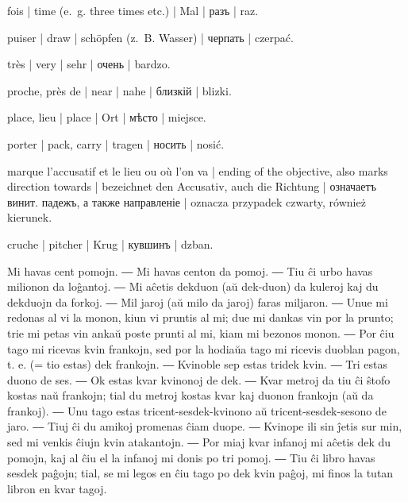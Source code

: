 \begin{ekzvocab}{1em}
 fois | time (e.~g. three times etc.) | Mal | разъ | raz.

 puiser | draw | schöpfen (z.~B. Wasser) | черпать | czerpać.

 très | very | sehr | очень | bardzo.

 proche, près de | near | nahe | близкій | blizki.

 place, lieu | place | Ort | мѣсто | miejsce.

 porter | pack, carry | tragen | носить | nosić.

 marque l’accusatif et le lieu ou où l’on va | ending of the objective, also marks direction towards | bezeichnet den Accusativ, auch die Richtung | означаетъ винит. падежъ, а также направленіе | oznacza przypadek czwarty, również kierunek.

 cruche | pitcher | Krug | кувшинъ | dzban.

\end{ekzvocab}



Mi havas cent pomojn. ― Mi havas centon da pomoj. ― Tiu ĉi urbo havas milionon da loĝantoj. ― Mi aĉetis dekduon (aŭ dek-duon) da kuleroj kaj du dekduojn da forkoj. ― Mil jaroj (aŭ milo da jaroj) faras miljaron. ― Unue mi redonas al vi la monon, kiun vi pruntis al mi; due mi dankas vin por la prunto; trie mi petas vin ankaŭ poste prunti al mi, kiam mi bezonos monon. ― Por ĉiu tago mi ricevas kvin frankojn, sed por la hodiaŭa tago mi ricevis duoblan pagon, t. e. (= tio estas) dek frankojn. ― Kvinoble sep estas tridek kvin. ― Tri estas duono de ses. ― Ok estas kvar kvinonoj de dek. ― Kvar metroj da tiu ĉi ŝtofo kostas naŭ frankojn; tial du metroj kostas kvar kaj duonon frankojn (aŭ da frankoj). ― Unu tago estas tricent-sesdek-kvinono aŭ tricent-sesdek-sesono de jaro. ― Tiuj ĉi du amikoj promenas ĉiam duope. ― Kvinope ili sin ĵetis sur min, sed mi venkis ĉiujn kvin atakantojn. ― Por miaj kvar infanoj mi aĉetis dek du pomojn, kaj al ĉiu el la infanoj mi donis po tri pomoj. ― Tiu ĉi libro havas sesdek paĝojn; tial, se mi legos en ĉiu tago po dek kvin paĝoj, mi finos la tutan libron en kvar tagoj.

